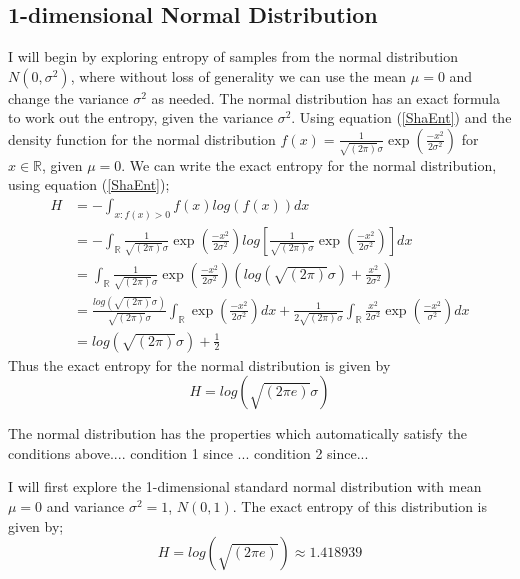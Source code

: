 \documentclass{article}
\begin{document}
\subsection{1-dimensional Normal Distribution}

I will begin by exploring entropy of samples from the normal distribution $N(0, \sigma^2)$, where without loss of generality we can use the mean $\mu = 0$ and change the variance $\sigma^2$ as needed. The normal distribution has an exact formula to work out the entropy, given the variance $\sigma^2$. Using equation (\ref{ShaEnt}) and the density function for the normal distribution $f(x) = \frac{1}{\sqrt{(2\pi)} \sigma}\exp{ \left( \frac{-x^2}{2\sigma^2} \right)}$ for $x \in \mathbb{R}$, given $\mu = 0$. We can write the exact entropy for the normal distribution, using equation (\ref{ShaEnt});
\begin{align}
H &= - \int_{x : f(x) > 0} f(x) log(f(x)) dx \nonumber \\
&= - \int_{\mathbb{R}} \frac{1}{\sqrt{(2\pi)} \sigma}\exp{ \left( \frac{-x^2}{2\sigma^2} \right)} log \left[\frac{1}{\sqrt{(2\pi)} \sigma}\exp{ \left( \frac{-x^2}{2\sigma^2} \right)} \right] dx \nonumber \\
&=  \int_{\mathbb{R}} \frac{1}{\sqrt{(2\pi)} \sigma}\exp{ \left( \frac{-x^2}{2\sigma^2} \right)} \left( log(\sqrt{(2\pi)}\sigma) +  \frac{x^2}{2\sigma^2} \right) \nonumber \\
&= \frac{log(\sqrt{(2\pi)}\sigma)}{\sqrt{(2\pi)} \sigma} \int_{\mathbb{R}} \exp{ \left( \frac{-x^2}{2\sigma^2} \right)} dx +  \frac{1}{2\sqrt{(2\pi)} \sigma} \int_{\mathbb{R}} \frac{x^2}{2\sigma^2}  \exp{ \left( \frac{-x^2}{\sigma^2} \right)} dx \nonumber \\
&=  log(\sqrt{(2\pi)}\sigma) + \frac{1}{2} \nonumber 
\end{align}
Thus the exact entropy for the normal distribution is given by 
\begin{equation}\label{NormalEnt}
H =  log(\sqrt{(2\pi e)}\sigma) 
\end{equation}

The normal distribution has the properties which automatically satisfy the conditions above.... condition 1 since ... condition 2 since...

I will first explore the 1-dimensional standard normal distribution with mean $\mu = 0$ and variance $\sigma^2 = 1$, $N(0, 1)$. The exact entropy of this distribution is given by;
\begin{equation} \label{normal_exact}
H = log(\sqrt{(2\pi e)}) \approx 1.418939
\end{equation}
\end{document}
